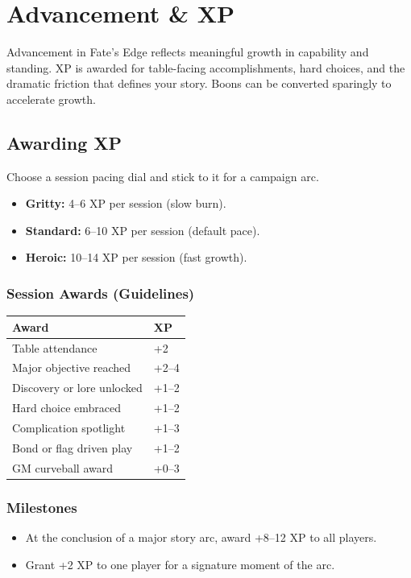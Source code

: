 
\section{Advancement \& XP}

Advancement in Fate's Edge reflects meaningful growth in capability and standing. XP is awarded for table-facing accomplishments, hard choices, and the dramatic friction that defines your story. Boons can be converted sparingly to accelerate growth.

\subsection{Awarding XP}

Choose a session pacing dial and stick to it for a campaign arc.

\begin{itemize}
  \item \textbf{Gritty:} 4--6 XP per session (slow burn).
  \item \textbf{Standard:} 6--10 XP per session (default pace).
  \item \textbf{Heroic:} 10--14 XP per session (fast growth).
\end{itemize}

\subsubsection{Session Awards (Guidelines)}

\begin{tabular}{@{}lp{5cm}@{}}
\toprule
\textbf{Award} & \textbf{XP} \\
\midrule
Table attendance & +2 \\
Major objective reached & +2--4 \\
Discovery or lore unlocked & +1--2 \\
Hard choice embraced & +1--2 \\
Complication spotlight & +1--3 \\
Bond or flag driven play & +1--2 \\
GM curveball award & +0--3 \\
\bottomrule
\end{tabular}

\subsubsection{Milestones}
\begin{itemize}
  \item At the conclusion of a major story arc, award +8--12 XP to all players.
  \item Grant +2 XP to one player for a signature moment of the arc.
\end{itemize}


